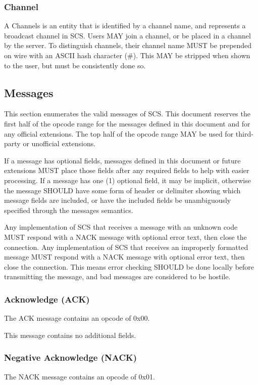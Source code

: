 \documentclass[12pt]{article}
\begin{document}
\subsubsection{Channel}
A Channels is an entity that is identified by a channel name, and represents a broadcast
channel in SCS. Users MAY join a channel, or be placed in a channel by the
server. To distinguish channels, their channel name MUST be prepended on wire
with an ASCII hash character (\#). This MAY be
stripped when shown to the user, but must be consistently done so. 

\subsection{Messages}
This section enumerates the valid messages of SCS. This document reserves the
first half of the opcode range for the messages defined in this document and for
any official extensions. The top half of the opcode range MAY be used for
third-party or unofficial extensions.

If a message has optional fields, messages defined in this document or future
extensions MUST place those fields after any required fields to help with easier
processing. If a message has one (1) optional field, it may be implicit,
otherwise the message SHOULD have some form of header or delimiter showing which
message fields are included, or have the included fields be unambiguously
specified through the messages semantics. 

Any implementation of SCS that receives a
message with an unknown code MUST respond with a NACK message with optional error
text, then close the connection. Any implementation of SCS that receives an
improperly formatted message MUST respond with a NACK message with optional error text,
then close the connection. This means error checking SHOULD be done locally
before transmitting the message, and bad messages are considered to be hostile.

\subsubsection{Acknowledge (ACK)}
The ACK message contains an opcode of 0x00.

This message contains no additional fields.

\subsubsection{Negative Acknowledge (NACK)}
The NACK message contains an opcode of 0x01.
\end{document}
